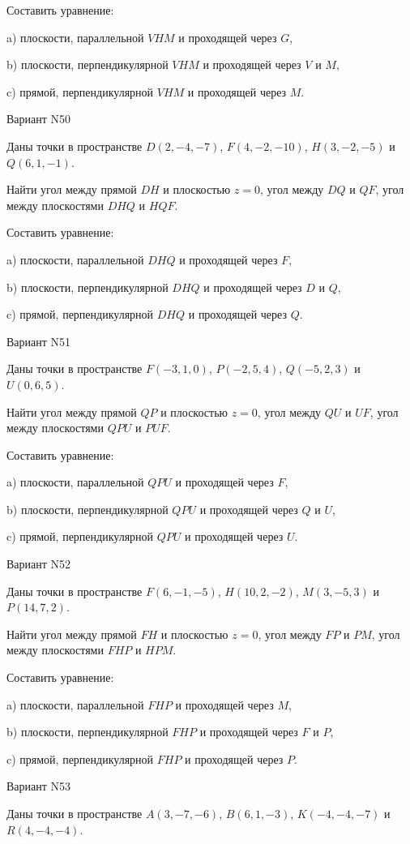 \documentclass[11pt]{report}
\begin{document}
Составить уравнение: 

a) плоскости, параллельной $VHM$ и проходящей через $G$,

b) плоскости, перпендикулярной $VHM$ и проходящей через $V$ и $M$,

c) прямой, перпендикулярной $VHM$ и проходящей через $M$.

Вариант N50

Даны точки в пространстве
$D(2, -4, -7)$, $F(4, -2, -10)$, $H(3, -2, -5)$ и
$Q(6, 1, -1)$.

Найти угол между прямой $DH$ и плоскостью $z = 0$, угол между $DQ$ и $QF$, угол между плоскостями $DHQ$ 
и $HQF$.

Составить уравнение: 

a) плоскости, параллельной $DHQ$ и проходящей через $F$,

b) плоскости, перпендикулярной $DHQ$ и проходящей через $D$ и $Q$,

c) прямой, перпендикулярной $DHQ$ и проходящей через $Q$.

Вариант N51

Даны точки в пространстве
$F(-3, 1, 0)$, $P(-2, 5, 4)$, $Q(-5, 2, 3)$ и
$U(0, 6, 5)$.

Найти угол между прямой $QP$ и плоскостью $z = 0$, угол между $QU$ и $UF$, угол между плоскостями $QPU$ 
и $PUF$.

Составить уравнение: 

a) плоскости, параллельной $QPU$ и проходящей через $F$,

b) плоскости, перпендикулярной $QPU$ и проходящей через $Q$ и $U$,

c) прямой, перпендикулярной $QPU$ и проходящей через $U$.

Вариант N52

Даны точки в пространстве
$F(6, -1, -5)$, $H(10, 2, -2)$, $M(3, -5, 3)$ и
$P(14, 7, 2)$.

Найти угол между прямой $FH$ и плоскостью $z = 0$, угол между $FP$ и $PM$, угол между плоскостями $FHP$ 
и $HPM$.

Составить уравнение: 

a) плоскости, параллельной $FHP$ и проходящей через $M$,

b) плоскости, перпендикулярной $FHP$ и проходящей через $F$ и $P$,

c) прямой, перпендикулярной $FHP$ и проходящей через $P$.

Вариант N53

Даны точки в пространстве
$A(3, -7, -6)$, $B(6, 1, -3)$, $K(-4, -4, -7)$ и
$R(4, -4, -4)$.
\end{document}
